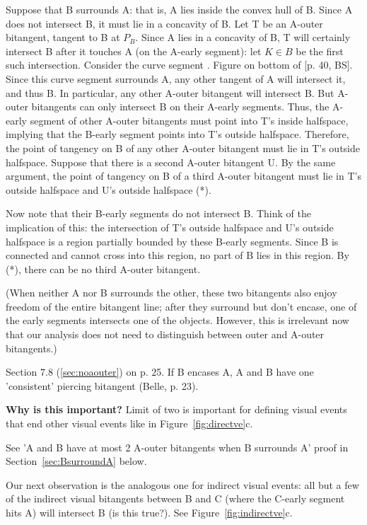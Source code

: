 \documentclass[12pt]{article}
\begin{document}
Suppose that B surrounds A: that is, A lies inside the convex hull of B.
Since A does not intersect B, it must lie in a concavity of B.
Let T be an A-outer bitangent, tangent to B at $P_B$.
Since A lies in a concavity of B, T will certainly intersect B after it touches A
(on the A-early segment): let $K \in B$ be the first such intersection.
Consider the curve segment .
Figure on bottom of [p. 40, BS].
Since this curve segment surrounds A, any other tangent of A will intersect it, and thus B.
In particular, any other A-outer bitangent will intersect B.
But A-outer bitangents can only intersect B on their A-early segments.
Thus, the A-early segment of other A-outer bitangents must point into T's inside halfspace,
implying that the B-early segment points into T's outside halfspace.
Therefore, the point of tangency on B of any other A-outer bitangent must lie
in T's outside halfspace.
Suppose that there is a second A-outer bitangent U.
By the same argument, the point of tangency on B of a third A-outer bitangent
must lie in T's outside halfspace and U's outside halfspace (*).

Now note that their B-early segments do not intersect B.
Think of the implication of this: the intersection of T's outside halfspace 
and U's outside halfspace is a region partially bounded by these B-early segments.
Since B is connected and cannot cross into this region, no part of B lies in this region.
By (*), there can be no third A-outer bitangent.
\QED

\clearpage

(When neither A nor B surrounds the other, these two bitangents also enjoy freedom
of the entire bitangent line; after they surround but don't encase, one of
the early segments intersects one of the objects.
However, this is irrelevant now that our analysis does not need to distinguish
between outer and A-outer bitangents.)

Section 7.8 (\ref{sec:noaouter}) on p. 25.
If B encases A, A and B have one 'consistent' piercing bitangent (Belle, p. 23).

{\bf Why is this important?}
Limit of two is important for defining visual events that end other visual events
like in Figure~\ref{fig:directve}c.

See 'A and B have at most 2 A-outer bitangents when B surrounds A' proof 
in Section~\ref{sec:BsurroundA} below.

\clearpage

Our next observation is the analogous one for indirect visual events:
all but a few of the indirect visual bitangents
between B and C (where the C-early segment hits A) will intersect B (is this true?).
See Figure~\ref{fig:indirectve}c.
\end{document}
